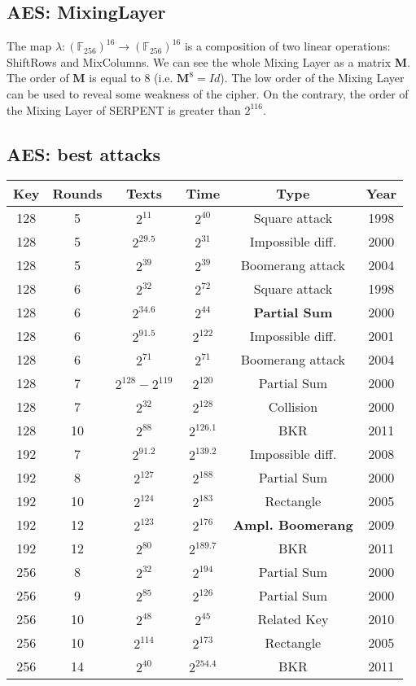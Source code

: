 \documentclass[a4paper, 10pt, titlepage]{article}
\begin{document}
\subsection{AES: MixingLayer}
The map $\lambda: (\mathbb{F}_{256})^{16} \rightarrow (\mathbb{F}_{256})^{16}$ is a composition of two linear operations: ShiftRows and MixColumns. We can see the whole Mixing Layer as a matrix \textbf{M}.
The order of \textbf{M} is equal to 8 (i.e. $\textbf{M}^8 = Id$). The low order of the Mixing Layer can be used to reveal some weakness of
the cipher. On the contrary, the order of the Mixing Layer of SERPENT is greater than $2^{116}$.

\subsection{AES: best attacks}
\begin{tabular}{|c||c|c|c|c|c|} \hline
Key & Rounds & Texts & Time & Type & Year \\ \hline
128 & 5 & $2^{11}$ & $2^{40}$ & Square attack & 1998 \\
128 & 5 & $2^{29.5}$ & $2^{31}$ & Impossible diff. & 2000 \\
128 & 5 & $2^{39}$ & $2^{39}$ & Boomerang attack & 2004 \\
128 & 6 & $2^{32}$ & $2^{72}$ & Square attack & 1998 \\
128 & 6 & $2^{34.6}$ & $2^{44}$ & \textbf{Partial Sum} & 2000 \\
128 & 6 & $2^{91.5}$ & $2^{122}$ & Impossible diff. & 2001 \\
128 & 6 & $2^{71}$ & $2^{71}$ & Boomerang attack & 2004 \\
128 & 7 & $2^{128} - 2^{119}$ & $2^{120}$ & Partial Sum & 2000 \\
128 & 7 & $2^{32}$ & $2^{128}$ & Collision & 2000 \\
128 & 10 & $2^{88}$ & $2^{126.1}$ & BKR & 2011 \\ 
\hline
192 & 7 & $2^{91.2}$ & $2^{139.2}$ & Impossible diff. & 2008 \\
192 & 8 & $2^{127}$ & $2^{188}$ & Partial Sum & 2000 \\
192 & 10 & $2^{124}$ & $2^{183}$ & Rectangle & 2005 \\
192 & 12 & $2^{123}$ & $2^{176}$ & \textbf{Ampl. Boomerang} & 2009 \\
192 & 12 & $2^{80}$ & $2^{189.7}$ & BKR & 2011 \\ 
\hline
256 & 8 & $2^{32}$ & $2^{194}$ & Partial Sum & 2000 \\
256 & 9 & $2^{85}$ & $2^{126}$ & Partial Sum & 2000 \\ 
256 & 10 & $2^{48}$ & $2^{45}$ & Related Key & 2010 \\
256 & 10 & $2^{114}$ & $2^{173}$ & Rectangle & 2005 \\
256 & 14 & $2^{40}$ & $2^{254.4}$ & BKR & 2011 \\ \hline
\end{tabular} \\
\end{document}
